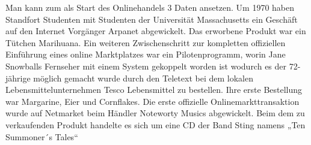  Man kann zum als Start des Onlinehandels 3 Daten ansetzen. Um 1970 haben Standfort Studenten mit Studenten der Universität Massachusetts ein Geschäft auf den Internet Vorgänger Arpanet abgewickelt. Das erworbene Produkt war ein Tütchen Marihuana. 
Ein weiteren Zwischenschritt zur kompletten offiziellen Einführung eines online Marktplatzes war ein Pilotenprogramm, worin Jane Snowballs Fernseher mit einem System gekoppelt worden ist wodurch es der 72-jährige möglich gemacht wurde durch den Teletext bei dem lokalen Lebensmittelunternehmen Tesco Lebensmittel zu bestellen. Ihre erste Bestellung war Margarine, Eier und Cornflakes. 
Die erste offizielle Onlinemarkttransaktion wurde auf Netmarket beim Händler Noteworty Musics abgewickelt. Beim dem zu verkaufenden Produkt handelte es sich um eine CD der Band Sting namens „Ten Summoner´s Tales“
